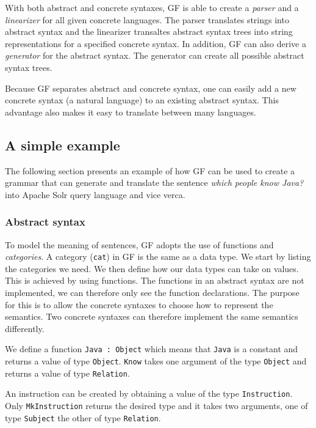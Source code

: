 With both abstract and concrete syntaxes, GF is able to create a \emph{parser} and a \emph{linearizer} for all given concrete languages. The parser translates strings into abstract syntax and the linearizer transaltes abstract syntax trees into string representations for a specified concrete syntax. In addition, GF can also derive a \emph{generator} for the abstract syntax. The generator can create all possible abstract syntax trees.

Because GF separates abstract and concrete syntax, one can easily add a new concrete syntax (a natural language) to an existing abstract syntax. This advantage also makes it easy to translate between many languages.

\subsection{A simple example}
The following section presents an example of how GF can be used to create a grammar that can generate and translate the sentence \emph{which people know Java?} into Apache Solr query language and vice verca.

\subsubsection*{Abstract syntax}
To model the meaning of sentences, GF adopts the use of functions and \emph{categories}. A category (\texttt{cat}) in GF is the same as a data type. We start by listing the categories we need. We then define how our data types can take on values. This is achieved by using functions. The functions in an abstract syntax are not implemented, we can therefore only see the function declarations. The purpose for this is to allow the concrete syntaxes to choose how to represent the semantics. Two concrete syntaxes can therefore implement the same semantics differently.

We define a function \texttt{Java : Object} which means that \texttt{Java} is a constant  and returns a value of type \texttt{Object}. \texttt{Know} takes one argument of the type \texttt{Object} and returns a value of type \texttt{Relation}.

An instruction can be created by obtaining a value of the type \texttt{Instruction}. Only \texttt{MkInstruction} returns the desired type and it takes two arguments, one of type \texttt{Subject} the other of type \texttt{Relation}.

